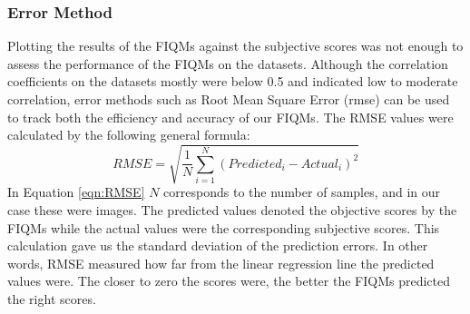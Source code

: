 \subsubsection{Error Method}
Plotting the results of the FIQMs against the subjective scores was not enough to assess the performance of the FIQMs on the datasets. Although the correlation coefficients on the datasets mostly were below 0.5 and indicated low to moderate correlation, error methods such as Root Mean Square Error (\acrshort{rmse}) can be used to track both the efficiency and accuracy of our FIQMs. The RMSE values were calculated by the following general formula: 
\begin{equation}
    RMSE = \sqrt{\frac{1}{N}\sum _{i=1}^{N}(Predicted_{i} - Actual_{i})^2}
    \label{eqn:RMSE}
\end{equation}
%
In Equation \ref{eqn:RMSE} $N$ corresponds to the number of samples, and in our case these were images. The predicted values denoted the objective scores by the FIQMs while the actual values were the corresponding subjective scores. This calculation gave us the standard deviation of the prediction errors. In other words, RMSE measured how far from the linear regression line the predicted values were. The closer to zero the scores were, the better the FIQMs predicted the right scores.

